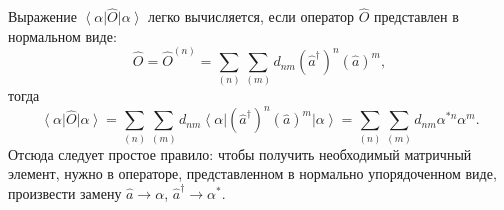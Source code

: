 Выражение $\left<\alpha\right|\hat{O}\left|\alpha\right>$ легко
вычисляется, если оператор $\hat{O}$ представлен в нормальном виде:
\begin{equation}
\hat{O} = \hat{O}^{(n)} = \sum_{(n)}\sum_{(m)} d_{nm}
\left(\hat{a}^{\dag}\right)^n
\left(\hat{a}\right)^m,
\label{eqCh1_normalO}
\end{equation}
тогда
\begin{equation}
\left<\alpha\right|\hat{O}\left|\alpha\right> = 
\sum_{(n)}\sum_{(m)} d_{nm}
\left<\alpha\right|
\left(\hat{a}^{\dag}\right)^n
\left(\hat{a}\right)^m
\left|\alpha\right> = 
\sum_{(n)}\sum_{(m)} d_{nm}
\alpha^{*n}\alpha^{m}.
\end{equation}
Отсюда следует простое правило: чтобы получить необходимый матричный
элемент, нужно в операторе, представленном в нормально упорядоченном
виде, произвести замену $\hat{a}\rightarrow\alpha$, 
$\hat{a}^{\dag}\rightarrow\alpha^{*}$.

